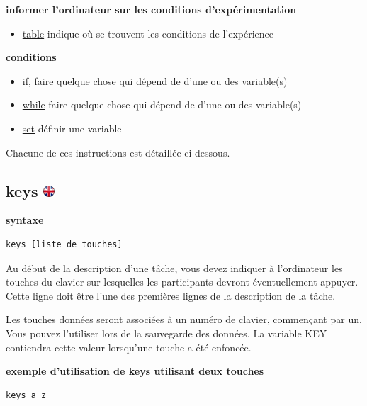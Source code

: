 \documentclass[
]{book}
\providecommand{\tightlist}{%
  \setlength{\itemsep}{0pt}\setlength{\parskip}{0pt}}
\begin{document}
\textbf{informer l'ordinateur sur les conditions d'expérimentation}

\begin{itemize}
\tightlist
\item
  \protect\hyperlink{task-table}{table} indique où se trouvent les conditions de l'expérience
\end{itemize}

\textbf{conditions}

\begin{itemize}
\tightlist
\item
  \protect\hyperlink{task-if}{if}, faire quelque chose qui dépend de d'une ou des variable(s)
\item
  \protect\hyperlink{task-while}{while} faire quelque chose qui dépend de d'une ou des variable(s)
\item
  \protect\hyperlink{task-set}{set} définir une variable
\end{itemize}

Chacune de ces instructions est détaillée ci-dessous.

\hypertarget{keys}{%
\subsection[keys ]{\texorpdfstring{keys \href{https://www.psytoolkit.org/doc3.2.0/syntax.html\#task-keys}{\protect\includegraphics{img/ukflag.png}}}{keys }}\label{keys}}

\textbf{syntaxe}

\begin{verbatim}
keys [liste de touches]
\end{verbatim}

Au début de la description d'une tâche, vous devez indiquer à l'ordinateur les touches du clavier sur lesquelles les participants devront éventuellement appuyer. Cette ligne doit être l'une des premières lignes de la description de la tâche.

Les touches données seront associées à un numéro de clavier, commençant par un. Vous pouvez l'utiliser lors de la sauvegarde des données. La variable KEY contiendra cette valeur lorsqu'une touche a été enfoncée.

\textbf{exemple d'utilisation de keys utilisant deux touches}

\begin{verbatim}
keys a z
\end{verbatim}
\end{document}
